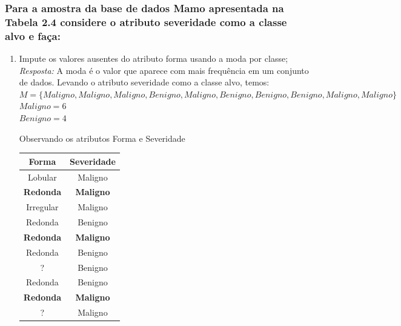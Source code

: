 \documentclass{article}
\begin{document}
\subsubsection{Para a amostra da base de dados Mamo apresentada na Tabela 2.4 considere o atributo severidade como a classe alvo e faça:}
\begin{enumerate}[label=\alph*]
  \item Impute os valores ausentes do atributo forma usando a moda por classe; \\
  \textit{Resposta:} A moda é o valor que aparece com mais frequência em um conjunto de dados.
  Levando o atributo severidade como a classe alvo, temos:\\
  $M=\{ Maligno, Maligno ,Maligno, Benigno, Maligno, Benigno, Benigno, Benigno, Maligno, Maligno\}$ \\
  $Maligno = 6$ \\
  $Benigno = 4$

  Observando os atributos Forma e Severidade

  \begin{table}[H]
    \centering
    \begin{tabular}{|c|c|}
    \hline
    \rowcolor[HTML]{C0C0C0} 
    Forma                                   & Severidade                              \\ \hline
    \rowcolor[HTML]{FFCCC9} 
    Lobular                                 & Maligno                                 \\ \hline
    \rowcolor[HTML]{FFCCC9} 
    \textbf{Redonda}                        & \textbf{Maligno}                        \\ \hline
    \rowcolor[HTML]{FFCCC9} 
    Irregular                               & Maligno                                 \\ \hline
    Redonda                                 & Benigno                                 \\ \hline
    \rowcolor[HTML]{FFCCC9} 
    {\color[HTML]{333333} \textbf{Redonda}} & {\color[HTML]{333333} \textbf{Maligno}} \\ \hline
    Redonda                                 & Benigno                                 \\ \hline
    ?                                       & Benigno                                 \\ \hline
    Redonda                                 & Benigno                                 \\ \hline
    \rowcolor[HTML]{FFCCC9} 
    \textbf{Redonda}                        & \textbf{Maligno}                        \\ \hline
    \rowcolor[HTML]{FFCCC9} 
    ?                                       & Maligno                                 \\ \hline
    \end{tabular}
    \end{table}


\end{enumerate}
\end{document}
